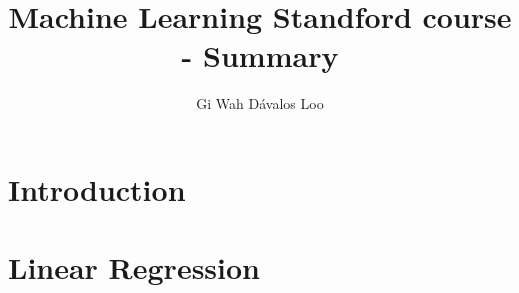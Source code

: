 \documentclass[12pt,a4paper]{article}
\title{Machine Learning Standford course - Summary}
\author{Gi Wah Dávalos Loo}
\begin{document}
\maketitle


\section{Introduction}


\section{Linear Regression}

\end{document}
